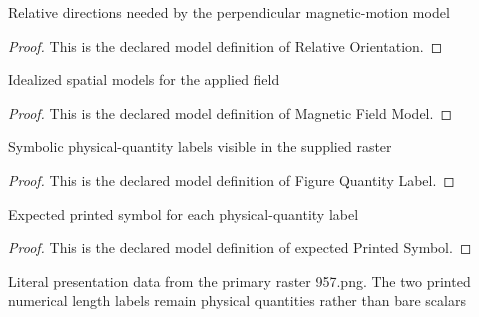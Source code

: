 \begin{definition}
  \label{def:physics:phyx-mini-0957:phyxminiproblems-problemphyxmini0957-relativeorientation}
  Relative directions needed by the perpendicular magnetic-motion model
\end{definition}
\begin{proof}
  This is the declared model definition of Relative Orientation.
\end{proof}
\begin{definition}
  \label{def:physics:phyx-mini-0957:phyxminiproblems-problemphyxmini0957-magneticfieldmodel}
  Idealized spatial models for the applied field
\end{definition}
\begin{proof}
  This is the declared model definition of Magnetic Field Model.
\end{proof}
\begin{definition}
  \label{def:physics:phyx-mini-0957:phyxminiproblems-problemphyxmini0957-figurequantitylabel}
  Symbolic physical-quantity labels visible in the supplied raster
\end{definition}
\begin{proof}
  This is the declared model definition of Figure Quantity Label.
\end{proof}
\begin{definition}
  \label{def:physics:phyx-mini-0957:phyxminiproblems-problemphyxmini0957-expectedprintedsymbol}
  Expected printed symbol for each physical-quantity label
\end{definition}
\begin{proof}
  This is the declared model definition of expected Printed Symbol.
\end{proof}
\begin{definition}
  \label{def:physics:phyx-mini-0957:phyxminiproblems-problemphyxmini0957-magneticdeflectionfigure}
  Literal presentation data from the primary raster 957.png. The two printed numerical length labels remain physical quantities rather than bare scalars
\end{definition}
